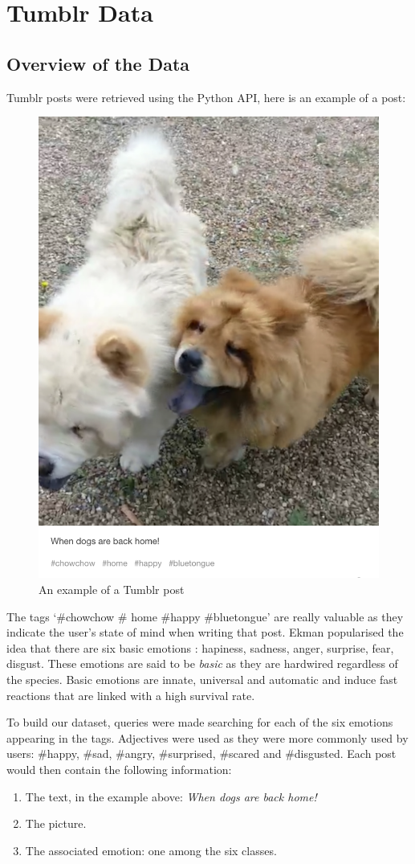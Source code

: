 \chapter{Tumblr Data}

\section{Overview of the Data}
Tumblr posts were retrieved using the Python API, here is an example of a post:
\begin{figure}[H]
\centering
\includegraphics[width=.58\textwidth]{Images/chowchow.png}
\caption{An example of a Tumblr post}
\end{figure}

The tags `\#chowchow \# home \#happy \#bluetongue' are really valuable as they indicate the user's state of mind when writing that post. Ekman popularised the idea that there are six basic emotions \cite{ekman}: hapiness, sadness, anger, surprise, fear, disgust. These emotions are said to be {\em basic} as they are hardwired regardless of the species. Basic emotions are innate, universal and automatic and induce fast reactions that are linked with a high survival rate.

To build our dataset, queries were made searching for each of the six emotions appearing in the tags. Adjectives were used as they were more commonly used by users: \#happy, \#sad, \#angry, \#surprised, \#scared and \#disgusted. Each post would then contain the following information:
\begin{enumerate}
\item The text, in the example above: \textit{When dogs are back home!}
\item The picture.
\item The associated emotion: one among the six classes.
\end{enumerate}

